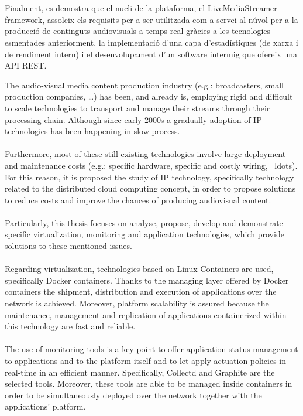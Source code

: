 \documentclass[english,final]{setup/eetac_tfc_pfc}
\begin{document}
\begin{resum}{10cm}
  \\
  \\
  Finalment, es demostra que el nucli de la plataforma, el LiveMediaStreamer framework, assoleix els requisits per a ser utilitzada com a servei al núvol per a la producció de continguts audiovisuals a temps real gràcies a les tecnologies esmentades anteriorment, la implementació d'una capa d'estadístiques (de xarxa i de rendiment intern) i el desenvolupament d'un software intermig que ofereix una API REST.
  
\end{resum}

\begin{overview}{11cm}
  The audio-visual media content production industry (e.g.: broadcasters, small production companies, \ldots) has been, and already is, employing rigid and difficult to scale technologies to transport and manage their streams through their processing chain. Although since early 2000s a gradually adoption of IP technologies has been happening in slow process.
  \\
  \\
  Furthermore, most of these still existing technologies involve large deployment and maintenance costs (e.g.: specific hardware, specific and costly wiring, \ ldots). For this reason, it is proposed the study of IP technology, specifically technology related to the distributed cloud computing concept, in order to propose solutions to reduce costs and improve the chances of producing audiovisual content.
  \\
  \\
  Particularly, this thesis focuses on analyse, propose, develop and demonstrate specific virtualization, monitoring and application technologies, which provide solutions to these mentioned issues.   
  \\
  \\
  Regarding virtualization, technologies based on Linux Containers are used, specifically Docker containers. Thanks to the managing layer offered by Docker containers the shipment, distribution and execution of applications over the network is achieved. Moreover, platform scalability is assured because the maintenance, management and replication of applications containerized within this technology are fast and reliable.
  \\
  \\
  The use of monitoring tools is a key point to offer application status management to applications and to the platform itself and to let apply actuation policies in real-time in an efficient manner. Specifically, Collectd and Graphite are the selected tools. Moreover, these tools are able to be managed inside containers in order to be simultaneously deployed over the network together with the applications' platform. 

\end{overview}
\end{document}

